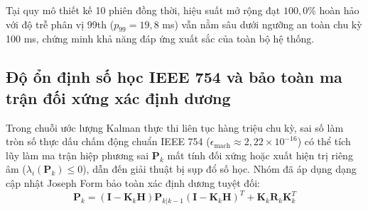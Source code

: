 \begin{table}[H]
\centering
\caption{Đo đạc thông lượng cực đại và hiệu suất mở rộng song song theo số phiên}
\label{tab:scalability-throughput-metrics}
\end{table}

Tại quy mô thiết kế 10 phiên đồng thời, hiệu suất mở rộng đạt $100{,}0\%$ hoàn hảo với độ trễ phân vị 99th ($p_{99} = 19{,}8$ ms) vẫn nằm sâu dưới ngưỡng an toàn chu kỳ 100 ms, chứng minh khả năng đáp ứng xuất sắc của toàn bộ hệ thống.

\subsection{Độ ổn định số học IEEE 754 và bảo toàn ma trận đối xứng xác định dương}

\hspace{0.5cm} Trong chuỗi ước lượng Kalman thực thi liên tục hàng triệu chu kỳ, sai số làm tròn số thực dấu chấm động chuẩn IEEE 754 ($\epsilon_{\text{mach}} \approx 2{,}22 \times 10^{-16}$) có thể tích lũy làm ma trận hiệp phương sai $\mathbf{P}_k$ mất tính đối xứng hoặc xuất hiện trị riêng âm ($\lambda_i(\mathbf{P}_k) \le 0$), dẫn đến giải thuật bị sụp đổ số học. Nhóm đã áp dụng dạng cập nhật Joseph Form bảo toàn xác định dương tuyệt đối:
\begin{equation}
\mathbf{P}_k = (\mathbf{I} - \mathbf{K}_k \mathbf{H}) \mathbf{P}_{k|k-1} (\mathbf{I} - \mathbf{K}_k \mathbf{H})^T + \mathbf{K}_k \mathbf{R}_k \mathbf{K}_k^T
\label{eq:joseph-stabilized-covariance-formula}
\end{equation}

